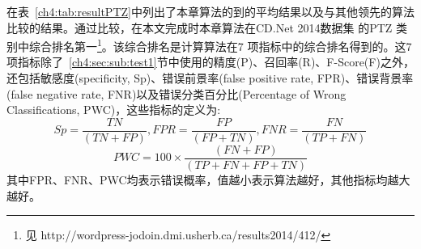  在表~\ref{ch4:tab:resultPTZ}中列出了本章算法的到的平均结果以及与其他领先的算法比较的结果。通过比较，在本文完成时本章算法在CD.Net 2014数据集\cite{CD2014} 的PTZ 类别中综合排名第一\footnote{见 http://wordpress-jodoin.dmi.usherb.ca/results2014/412/}。该综合排名是计算算法在7 项指标中的综合排名得到的。这7项指标除了~\ref{ch4:sec:sub:test1}节中使用的精度(P)、召回率(R)、F-Score(F)之外，还包括敏感度(specificity, Sp)、错误前景率(false positive rate, FPR)、错误背景率(false negative rate, FNR)以及错误分类百分比(Percentage of Wrong Classifications, PWC)，这些指标的定义为:
 $$ Sp = \frac{TN}{(TN + FP)},FPR = \frac{FP}{(FP+TN)}, FNR = \frac{FN}{(TP+FN)} $$
 $$ PWC = 100 \times \frac{(FN+FP)}{(TP+FN+FP+TN)} $$
 其中FPR、FNR、PWC均表示错误概率，值越小表示算法越好，其他指标均越大越好。
 \begin{table}[ht]
\caption{CD.Net 2014数据集\cite{CD2014}中的PTZ分类视频处理结果比较}
\label{ch4:tab:resultPTZ}
\end{table}


